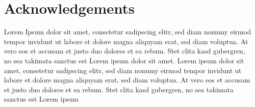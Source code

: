 \documentclass[12pt]{doctoral_thesis_uniwue}
\begin{document}


\newpage


\setcounter{page}{1} %




\section*{Acknowledgements} %
Lorem Ipsum dolor sit amet, consetetur sadipscing elitr, sed diam nonumy
eirmod tempor invidunt ut labore et dolore magna aliquyam erat, sed diam
voluptua. At vero eos et accusam et justo duo dolores et ea rebum. Stet
clita kasd gubergren, no sea takimata sanctus est Lorem ipsum dolor sit
amet. Lorem ipsum dolor sit amet, consetetur sadipscing elitr, sed diam
nonumy eirmod tempor invidunt ut labore et dolore magna aliquyam erat,
sed diam voluptua. At vero eos et accusam et justo duo dolores et ea
rebum. Stet clita kasd gubergren, no sea takimata sanctus est Lorem
ipsum

\newpage




\newpage




{\footnotesize \tableofcontents}

\newpage



\setcounter{page}{1} %
\end{document}
